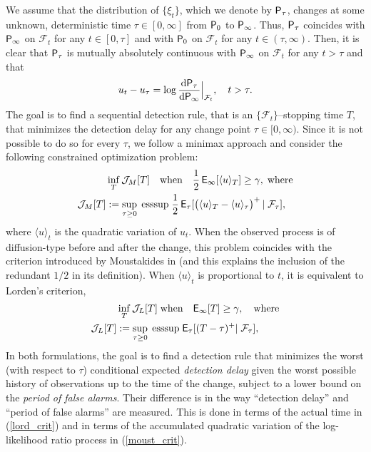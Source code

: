 \documentclass[11pt,reqno]{amsart}
\theoremstyle{remark}
\begin{document}
We assume that the distribution of $\{\xi_{t}\}$, which we denote by ${{\sf P}}_{\tau}$, changes at some unknown, deterministic time $\tau \in [0,\infty]$ from ${{\sf P}}_{0}$ to ${{\sf P}}_{\infty}$. Thus, ${{\sf P}}_{\tau}$ coincides with ${{\sf P}}_{\infty}$ on ${\mathcal{F}_{t}}$ for any $t \in [0, \tau]$ and with ${{\sf P}}_{0}$ on ${\mathcal{F}_{t}}$ for any $t \in (\tau, \infty)$. Then, it is clear that  ${{\sf P}}_{\tau}$ is mutually absolutely continuous with ${{\sf P}}_{\infty}$ on  ${\mathcal{F}_{t}}$  for any  $t > \tau$ and that
\begin{equation*} 
u_{t}-u_{\tau}= \log \frac{\text{d}{{\sf P}}_{\tau}}{\text{d}{{\sf P}}_{\infty}} \Big|_{\mathcal{F}_{t}}, \quad t > \tau.
\end{equation*}
The goal is to find a  sequential detection rule, that is an $\{{\mathcal{F}_{t}}\}$--stopping time $T$, that minimizes the detection delay for any change point $\tau  \in [0,\infty)$.
Since it is not possible to do so for every $\tau$, we follow a minimax approach and consider the following constrained optimization problem:
\begin{align} \label{moust_crit} 
\begin{split}
&\inf_{T}  {\mathcal{J}}_{M}[{T}] \quad \text{when} \quad  \frac{1}{2} \, {{\sf E}}_{\infty} [\langle u \rangle_{T}] \geq \gamma, \; \text{where} \\
{\mathcal{J}}_{M}[{T}] &:= \sup_{ \tau \geq 0} \; \text{esssup}  \; \frac{1}{2} \,  {{\sf E}}_{\tau} [\bigl(\langle u \rangle_{T}-\langle u \rangle_{\tau} \bigr)^{+} \, | \; {\mathcal{F}}_{\tau}],
\end{split}
\end{align}
where $\langle u \rangle_{t}$ is the quadratic variation of $u_{t}$. When the observed process is of diffusion-type before and after the change, this problem coincides with the criterion introduced by Moustakides in \cite{moustito} (and this explains the inclusion of the  redundant $1/2$ in its definition).  When $\langle u \rangle_{t}$ is proportional to $t$, it is equivalent to  Lorden's  criterion, 
\begin{align}   \label{lord_crit}
\begin{split}
&\inf_{T} {\mathcal{J}}_{L}[{T}] \;\text{when} \quad {{\sf E}}_{\infty} [{T}] \geq \gamma, \quad \text{where} \\  
{\mathcal{J}}_{L}[{T}] &:= \sup_{ \tau \geq 0} \; \text{esssup}  \; {{\sf E}}_{\tau} [({T}-\tau)^{+} | \; {\mathcal{F}}_{\tau}],
\end{split}
\end{align}
In both formulations, the goal is to find a detection rule that minimizes the worst (with respect to $\tau$) conditional expected \textit{detection delay}  given the worst possible history of observations up to the time of the change, subject to a lower bound on the \textit{period of false alarms}. Their difference is in the way ``detection delay'' and ``period of false alarms'' are measured. This is done in terms of the actual time in (\ref{lord_crit}) and 
in  terms of the accumulated quadratic variation of the log-likelihood ratio process in (\ref{moust_crit}). 
\end{document}
